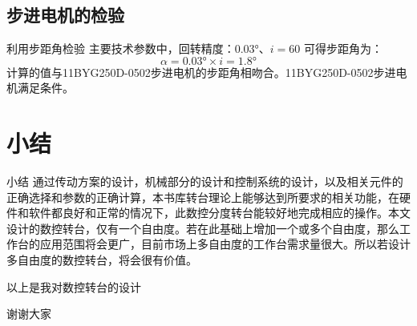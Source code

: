 \documentclass[12pt,xcolor={rgb}]{beamer}
\begin{document}
\subsection{步进电机的检验}

\begin{frame}{利用步距角检验}
主要技术参数中，回转精度：$0.03°$、$i=60 $ 可得步距角为： $$\alpha=0.03°\times i=1.8°$$
计算的值与11BYG250D-0502步进电机的步距角相吻合。11BYG250D-0502步进电机满足条件。
\end{frame}

\section{小结}
\begin{frame}{小结}
通过传动方案的设计，机械部分的设计和控制系统的设计，以及相关元件的正确选择和参数的正确计算，本书库转台理论上能够达到所要求的相关功能，在硬件和软件都良好和正常的情况下，此数控分度转台能较好地完成相应的操作。本文设计的数控转台，仅有一个自由度。若在此基础上增加一个或多个自由度，那么工作台的应用范围将会更广，目前市场上多自由度的工作台需求量很大。所以若设计多自由度的数控转台，将会很有价值。
\end{frame}

\begin{frame}[plain]
	
	\begin{center}
		{\LARGE  以上是我对数控转台的设计 }
		\vspace{1cm}
		
		{\LARGE  谢谢大家 }
	\end{center}
	
\end{frame}
\end{document}
